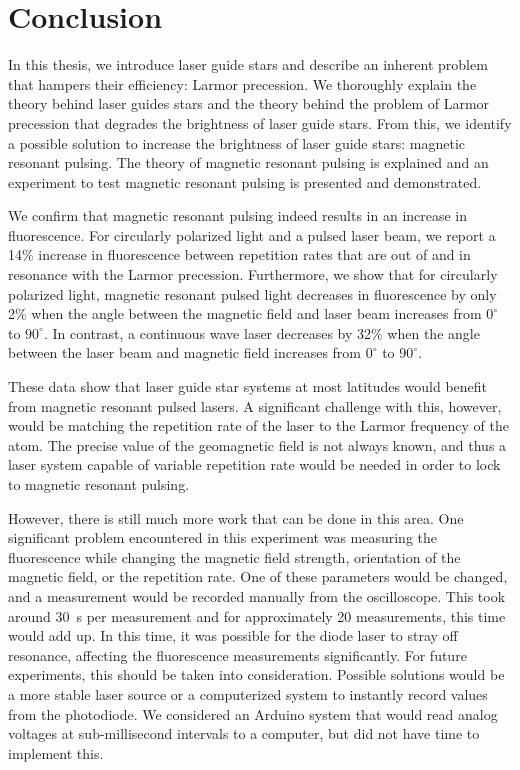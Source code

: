 \chapter{Conclusion}
In this thesis, we introduce laser guide stars and describe an inherent problem that hampers their efficiency: Larmor precession. We thoroughly explain the theory behind laser guides stars and the theory behind the problem of Larmor precession that degrades the brightness of laser guide stars. From this, we identify a possible solution to increase the brightness of laser guide stars: magnetic resonant pulsing. The theory of magnetic resonant pulsing is explained and an experiment to test magnetic resonant pulsing is presented and demonstrated.

We confirm that magnetic resonant pulsing indeed results in an increase in fluorescence. For circularly polarized light and a pulsed laser beam, we report a 14\% increase in fluorescence between repetition rates that are out of and in resonance with the Larmor precession. Furthermore, we show that for circularly polarized light, magnetic resonant pulsed light decreases in fluorescence by only 2\% when the angle between the magnetic field and laser beam increases from $0^{\circ}$ to $90^{\circ}$. In contrast, a continuous wave laser decreases by 32\% when the angle between the laser beam and magnetic field increases from $0^{\circ}$ to $90^{\circ}$.

These data show that laser guide star systems at most latitudes would benefit from magnetic resonant pulsed lasers. A significant challenge with this, however, would be matching the repetition rate of the laser to the Larmor frequency of the atom. The precise value of the geomagnetic field is not always known, and thus a laser system capable of variable repetition rate would be needed in order to lock to magnetic resonant pulsing. 

However, there is still much more work that can be done in this area. One significant problem encountered in this experiment was measuring the fluorescence while changing the magnetic field strength, orientation of the magnetic field, or the repetition rate. One of these parameters would be changed, and a measurement would be recorded manually from the oscilloscope. This took around \SI{30}{\second} per measurement and for approximately 20 measurements, this time would add up. In this time, it was possible for the diode laser to stray off resonance, affecting the fluorescence measurements significantly. For future experiments, this should be taken into consideration. Possible solutions would be a more stable laser source or a computerized system to instantly record values from the photodiode. We considered an Arduino system that would read analog voltages at sub-millisecond intervals to a computer, but did not have time to implement this.

